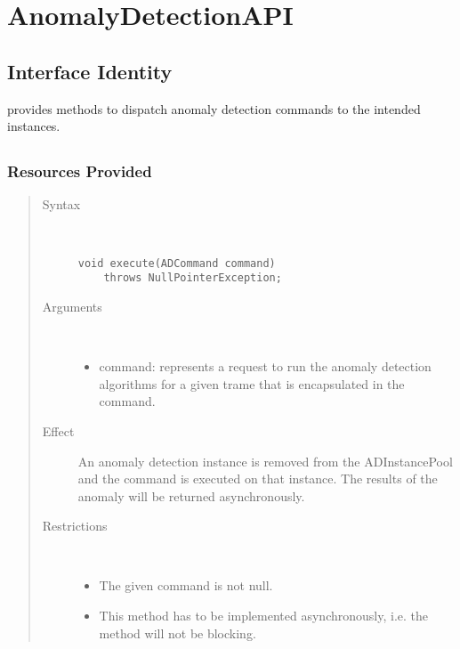 \section{AnomalyDetectionAPI}
\label{api:anomaly-detection-api}

\subsection{Interface Identity}

\npar {} provides methods to dispatch anomaly
detection commands to the intended instances.

\subsection{}

\subsubsection{Resources Provided}

\begin{quote}
	\begin{description}
		\item[Syntax] \ 
		\begin{verbatim}
void execute(ADCommand command) 
    throws NullPointerException;
		\end{verbatim}
		\item[Arguments] \
		\begin{itemize}
			\item command: represents a request to run the anomaly detection algorithms
			for a given trame that is encapsulated in the command.
		\end{itemize}
		\item[Effect] An anomaly detection instance is removed from the ADInstancePool
		and the command is executed on that instance. The results of the anomaly will
		be returned asynchronously. 
		\item[Restrictions] \ 
		\begin{itemize}
			\item The given command is not null.
			\item This method has to be implemented asynchronously, i.e. the method will
			not be blocking.
		\end{itemize}
	\end{description} 
\end{quote}

